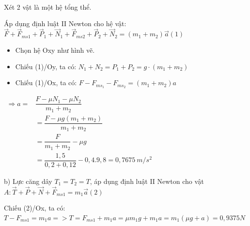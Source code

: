 \begin{vidu}
{Xét 2 vật là một hệ tổng thể.

Áp dụng định luật II Newton cho hệ vật: $\vec{F}+\vec{F}_{m s 1}+\vec{P}_1+\vec{N}_1+\vec{F}_{m s 2}+\vec{P}_2+\vec{N}_2=\left(m_1+m_2\right) \vec{a}(1)$

\begin{itemize}
\item Chọn hệ Oxy như hình vẽ.

\item Chiếu (1)/Oy, ta có: $N_1+N_2=P_1+P_2=g \cdot\left(m_1+m_2\right)$

\item Chiếu (1)/Ox, ta có: $F-F_{m s_1}-F_{m s_2}=\left(m_1+m_2\right) a$

\end{itemize}

$
\begin{aligned}
\Rightarrow a= & \dfrac{F-\mu N_1-\mu N_2}{m_1+m_2} \\
& =\dfrac{F-\mu g\left(m_1+m_2\right)}{m_1+m_2} \\
& =\dfrac{F}{m_1+m_2}-\mu g \\
& =\dfrac{1,5}{0,2+0,12}-0,4.9,8=0,7675\ m/s^2
\end{aligned}
$

b) Lực căng dây $T_1=T_2=T$, áp dụng định luật II Newton cho vật $A: \vec{T}+\vec{P}+\vec{N}+\vec{F}_{m s 1}=m_1 \vec{a}(2)$

Chiếu (2)/Ox, ta có: $T-F_{m s 1}=m_1 a=>T=F_{m s 1}+m_1 a=\mu m_1 g+m_1 a=m_1(\mu g+a)=0,9375 N$

}
 \end{vidu}
